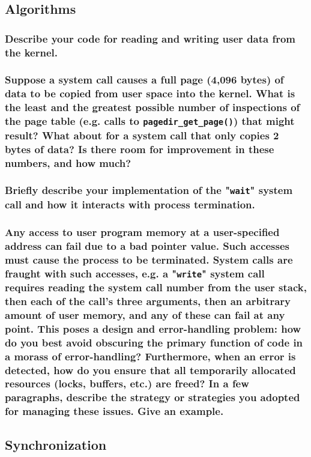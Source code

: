 \documentclass[sigconf, nonacm, balance=false, urlbreakonhyphens=true]{acmart}
\begin{document}
        \subsection{Algorithms}

            \subsubsection{Describe your code for reading and writing user data from the kernel. } 

            \subsubsection{Suppose a system call causes a full page (4,096 bytes) of data to be copied from user space into the kernel.  What is the least and the greatest possible number of inspections of the page table (e.g. calls to \texttt{pagedir\_get\_page()}) that might result?  What about for a system call that only copies 2 bytes of data?  Is there room for improvement in these numbers, and how much? }

            \subsubsection{Briefly describe your implementation of the "\texttt{wait}" system call and how it interacts with process termination. }

            \subsubsection{Any access to user program memory at a user-specified address can fail due to a bad pointer value.  Such accesses must cause the process to be terminated.  System calls are fraught with such accesses, e.g. a "\texttt{write}" system call requires reading the system call number from the user stack, then each of the call's three arguments, then an arbitrary amount of user memory, and any of these can fail at any point.  This poses a design and error-handling problem: how do you best avoid obscuring the primary function of code in a morass of error-handling?  Furthermore, when an error is detected, how do you ensure that all temporarily allocated resources (locks, buffers, etc.) are freed?  In a few paragraphs, describe the strategy or strategies you adopted for managing these issues.  Give an example. }

        \subsection{Synchronization}
\end{document}
